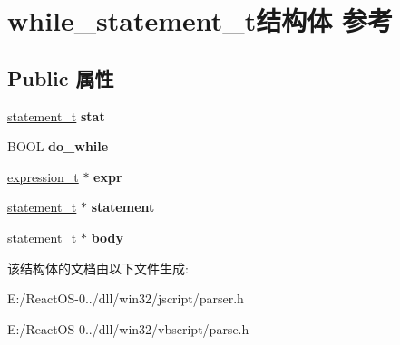 \hypertarget{structwhile__statement__t}{}\section{while\+\_\+statement\+\_\+t结构体 参考}
\label{structwhile__statement__t}
\subsection*{Public 属性}
\begin{DoxyCompactItemize}
\item 
\mbox{\label{structwhile__statement__t_a71ef57844032e732624795673f197e2c}} 
\hyperlink{struct__statement__t}{statement\+\_\+t} {\bfseries stat}
\item 
\mbox{\label{structwhile__statement__t_a67db140fdf30b8fb67eab6f72644d67d}} 
B\+O\+OL {\bfseries do\+\_\+while}
\item 
\mbox{\label{structwhile__statement__t_a50d6db97e758b3c8645e8a606c470444}} 
\hyperlink{struct__expression__t}{expression\+\_\+t} $\ast$ {\bfseries expr}
\item 
\mbox{\label{structwhile__statement__t_a99ab23b9c3567cb10106343db7787015}} 
\hyperlink{struct__statement__t}{statement\+\_\+t} $\ast$ {\bfseries statement}
\item 
\mbox{\label{structwhile__statement__t_a821f90442e9f37f0643d2fe4f0c4d38c}} 
\hyperlink{struct__statement__t}{statement\+\_\+t} $\ast$ {\bfseries body}
\end{DoxyCompactItemize}


该结构体的文档由以下文件生成\+:\begin{DoxyCompactItemize}
\item 
E\+:/\+React\+O\+S-\/0../dll/win32/jscript/parser.\+h\item 
E\+:/\+React\+O\+S-\/0../dll/win32/vbscript/parse.\+h\end{DoxyCompactItemize}
